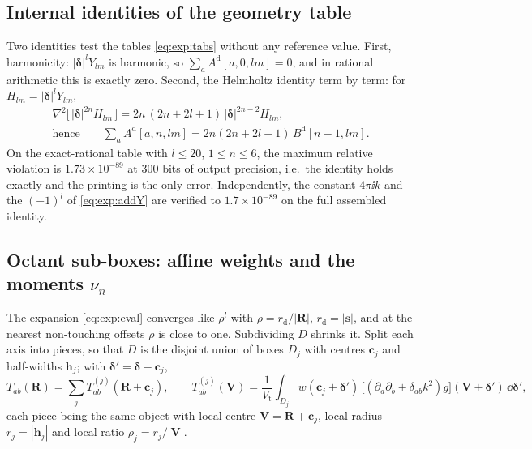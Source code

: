 \subsection{Internal identities of the geometry table}
\label{sec:exp:ident}

Two identities test the tables \eqref{eq:exp:tabs} without any reference value. First,
harmonicity: $|\boldsymbol{\delta}|^lY_{lm}$ is harmonic, so
$\sum_a A^{\mathrm{d}}[a,0,lm] = 0$, and in rational arithmetic this is exactly zero.
Second, the Helmholtz identity term by term: for $H_{lm} =
|\boldsymbol{\delta}|^lY_{lm}$,
\begin{equation}
\begin{gathered}
\nabla^2\bigl[\,|\boldsymbol{\delta}|^{2n}H_{lm}\,\bigr]
= 2n\,(2n+2l+1)\,|\boldsymbol{\delta}|^{2n-2}H_{lm},\\
\text{hence}\qquad
\sum_a A^{\mathrm{d}}[a,n,lm] = 2n(2n+2l+1)\,B^{\mathrm{d}}[n-1,lm].
\end{gathered}
\label{eq:exp:helm}
\end{equation}
On the exact-rational table with $l \le 20$, $1 \le n \le 6$, the maximum relative
violation is $1.73\times10^{-89}$ at $300$ bits of output precision, i.e.\ the identity
holds exactly and the printing is the only error. Independently, the constant $4\pi\ii k$
and the $(-1)^l$ of \eqref{eq:exp:addY} are verified to $1.7\times10^{-89}$ on the full
assembled identity.

\subsection{\texorpdfstring{Octant sub-boxes: affine weights and the moments $\nu_n$}{Octant sub-boxes: affine weights and the moments nu\_n}}
\label{sec:exp:sub}

The expansion \eqref{eq:exp:eval} converges like $\rho^l$ with $\rho =
r_{\mathrm{d}}/|\mathbf{R}|$, $r_{\mathrm{d}} = |\mathbf{s}|$, and at the nearest
non-touching offsets $\rho$ is close to one. Subdividing $D$ shrinks it. Split each axis
into pieces, so that $D$ is the disjoint union of boxes $D_j$ with centres
$\mathbf{c}_j$ and half-widths $\mathbf{h}_j$; with $\boldsymbol{\delta}' =
\boldsymbol{\delta}-\mathbf{c}_j$,
\begin{equation}
T_{ab}(\mathbf{R}) = \sum_j T^{(j)}_{ab}(\mathbf{R}+\mathbf{c}_j),
\qquad
T^{(j)}_{ab}(\mathbf{V}) = \frac{1}{V_{\mathrm{t}}}\int_{D_j}
w(\mathbf{c}_j+\boldsymbol{\delta}')\,
\bigl[(\partial_a\partial_b+\delta_{ab}k^2)g\bigr](\mathbf{V}+\boldsymbol{\delta}')\,
\dd\boldsymbol{\delta}' ,
\label{eq:exp:split}
\end{equation}
each piece being the same object with local centre $\mathbf{V} = \mathbf{R}+\mathbf{c}_j$,
local radius $r_j = |\mathbf{h}_j|$ and local ratio $\rho_j = r_j/|\mathbf{V}|$.

